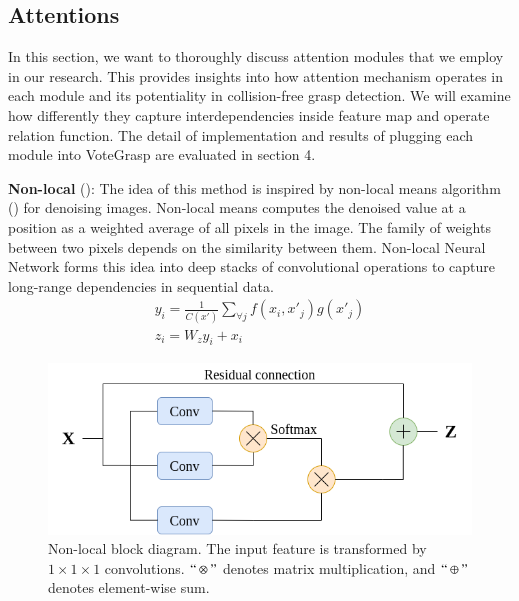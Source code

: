 \vspace{0.2cm}

\subsection{Attentions}
\label{sec:attentions}
In this section, we want to thoroughly discuss attention modules that we employ in our research. This provides insights into how attention mechanism operates in each module and its potentiality in collision-free grasp detection. We will examine how differently they capture interdependencies inside feature map and operate relation function. The detail of implementation and results of plugging each module into VoteGrasp are evaluated in section 4.

\textbf{Non-local} (\textcolor{cyan}{\cite{wang2018non}}):
The idea of this method is inspired by non-local means algorithm (\textcolor{cyan}{\cite{buades2005non}}) for denoising images. Non-local means computes the denoised value at a position as a weighted average of all pixels in the image. The family of weights between two pixels depends on the similarity between them. Non-local Neural Network forms this idea into deep stacks of convolutional operations to capture long-range dependencies in sequential data. 
\begin{gather}
	\label{eq: non_local_comp_response}
	y_i = \frac{1}{C(x')} \sum_{\forall j}^{} f(x_i, x'_j)g(x'_j) \\
	\label{eq: non_local_comp_z}
	z_i = W_z y_i + x_i \
\end{gather}

\begin{figure}
 	\centering	
 	\includegraphics[width= 0.8\linewidth]{figs/non_local_diagram.png}
 	\caption{Non-local block diagram. The input feature is transformed by $1 \times 1 \times 1$ convolutions. $``\otimes"$ denotes matrix multiplication, and $``\oplus"$ denotes element-wise sum.}
 	\label{fig:non_local}
\end{figure}

